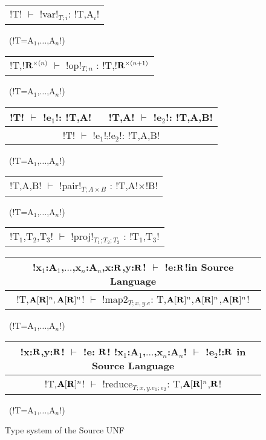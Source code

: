 \begin{figure*}[tb]
    \centering
    \begin{tabular}{c} 
    \\\hline
    !T! $\vdash$ !var!$_{T;i}$: !T,A$_i$!
    \end{tabular}~(!T=A$_{1}$,$\ldots$,A$_n$!)
    \hspace{0.5cm}
    \begin{tabular}{c}
        \\\hline
        !T,!$\mathbf{R}^{\times(n)}$ $\vdash$ !op!$_{T;n}$ : !T,!$\mathbf{R}^{\times(n+1)}$
    \end{tabular}~(!T=A$_{1}$,$\ldots$,A$_n$!)

    \begin{tabular}{c}
    !T! $\vdash$ !e$_{1}$!: !T,A! $\quad$ !T,A! $\vdash$ !e$_{2}$!: !T,A,B! \\\hline
    !T! $\vdash$ !e$_{1}$!$\comp$!e$_{2}$!: !T,A,B!
    \end{tabular}~(!T=A$_{1}$,$\ldots$,A$_n$!)

    \begin{tabular}{c}
        \\\hline
        !T,A,B! $\vdash$ !pair!$_{T;A\times B}$ : !T,A!$\times$!B!
    \end{tabular}~(!T=A$_{1}$,$\ldots$,A$_n$!)

    \begin{tabular}{c}
        \\\hline
        !T$_{1}$,T$_{2}$,T$_{3}$! $\vdash$ !proj!$_{T_1;T_2;T_3}$ : !T$_{1}$,T$_{3}$!
    \end{tabular}

    \begin{tabular}{c}
        !x$_{1}$:A$_{1}$,$\ldots$,x$_n$:A$_n$,x:$\mathbf{R}$,y:$\mathbf{R}$! $\vdash$ !e:$\mathbf{R}$!\quad in Source Language
        \\\hline  
        !T,$\mathbf{A}[\mathbf{R}]^{n},\mathbf{A}[\mathbf{R}]^{n}$! $\vdash$ !map2$_{T; x,y.e}$: T,$\mathbf{A}[\mathbf{R}]^{n}$,$\mathbf{A}[\mathbf{R}]^{n}$,$\mathbf{A}[\mathbf{R}]^{n}$!
    \end{tabular}~(!T=A$_{1}$,$\ldots$,A$_n$!)

    \begin{tabular}{c}
        !x:$\mathbf{R}$,y:$\mathbf{R}$! $\vdash$ !e: $\mathbf{R}$! \quad !x$_{1}$:A$_{1}$,$\ldots$,x$_n$:A$_n$! $\vdash$ !e$_{2}$!:$\mathbf{R}$ \quad in Source Language
        \\\hline  
        !T,$\mathbf{A}[\mathbf{R}]^{n}$! $\vdash$ !reduce$_{T; x,y.e_1; e_2}$: T,$\mathbf{A}[\mathbf{R}]^{n}$,$\mathbf{R}$!
    \end{tabular}~(!T=A$_{1}$,$\ldots$,A$_n$!)
    \vspace{-0.2cm}
    \caption{Type system of the Source UNF}
    \vspace{-0.4cm}
    \label{fig:source_unf_typesystem}
\end{figure*}